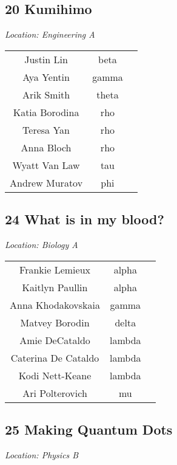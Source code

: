 \documentclass{article}
\begin{document}
\begin{center}
\section*{20 Kumihimo}
\end{center}
\begin{center}
\textit{Location: Engineering A}
\end{center}
\setlength{\tabcolsep}{60pt}
\centering
\begin{tabular}{c c c}
Justin Lin & beta \\
Aya Yentin & gamma \\
Arik Smith & theta \\
Katia Borodina & rho \\
Teresa Yan & rho \\
Anna Bloch & rho \\
Wyatt Van Law & tau \\
Andrew Muratov & phi \\
\end{tabular}
\pagebreak
\begin{center}
\section*{24 What is in my blood?}
\end{center}
\begin{center}
\textit{Location: Biology A}
\end{center}
\setlength{\tabcolsep}{60pt}
\centering
\begin{tabular}{c c c}
Frankie Lemieux & alpha \\
Kaitlyn Paullin & alpha \\
Anna Khodakovskaia & gamma \\
Matvey Borodin & delta \\
Amie DeCataldo & lambda \\
Caterina De Cataldo & lambda \\
Kodi Nett-Keane & lambda \\
Ari Polterovich & mu \\
\end{tabular}
\begin{center}
\section*{25 Making Quantum Dots}
\end{center}
\begin{center}
\textit{Location: Physics B}
\end{center}
\end{document}
